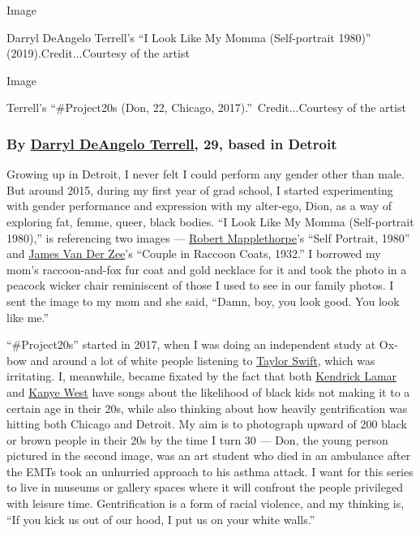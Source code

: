 Image

Darryl DeAngelo Terrell's ``I Look Like My Momma (Self-portrait 1980)''
(2019).Credit...Courtesy of the artist

Image

Terrell's ``\#Project20s (Don, 22, Chicago, 2017).''~Credit...Courtesy
of the artist

\hypertarget{by-darryl-deangelo-terrell-29-based-in-detroit}{%
\subsubsection{\texorpdfstring{\textbf{By}
\textbf{\href{http://darryldterrell.com/}{Darryl DeAngelo Terrell}, 29,
based in
Detroit}}{By Darryl DeAngelo Terrell, 29, based in Detroit}}\label{by-darryl-deangelo-terrell-29-based-in-detroit}}

Growing up in Detroit, I never felt I could perform any gender other
than male. But around 2015, during my first year of grad school, I
started experimenting with gender performance and expression with my
alter-ego, Dion, as a way of exploring fat, femme, queer, black bodies.
``I Look Like My Momma (Self-portrait 1980),'' is referencing two images
---
\href{https://www.nytimes3xbfgragh.onion/topic/person/robert-mapplethorpe}{Robert
Mapplethorpe}'s ``Self Portrait, 1980'' and
\href{https://www.nytimes3xbfgragh.onion/2019/02/28/nyregion/harlem-renaissance-james-van-der-zee.html}{James
Van Der Zee}'s ``Couple in Raccoon Coats, 1932.'' I borrowed my mom's
raccoon-and-fox fur coat and gold necklace for it and took the photo in
a peacock wicker chair reminiscent of those I used to see in our family
photos. I sent the image to my mom and she said, ``Damn, boy, you look
good. You look like me.''

``\#Project20s'' started in 2017, when I was doing an independent study
at Ox-bow and around a lot of white people listening to
\href{https://www.nytimes3xbfgragh.onion/topic/person/taylor-swift}{Taylor
Swift}, which was irritating. I, meanwhile, became fixated by the fact
that both
\href{https://www.nytimes3xbfgragh.onion/2017/03/01/t-magazine/beck-tom-waits-kendrick-lamar.html}{Kendrick
Lamar} and
\href{https://www.nytimes3xbfgragh.onion/2015/04/10/t-magazine/kanye-west-adidas-yeezy-fashion-interview.html}{Kanye
West} have songs about the likelihood of black kids not making it to a
certain age in their 20s, while also thinking about how heavily
gentrification was hitting both Chicago and Detroit. My aim is to
photograph upward of 200 black or brown people in their 20s by the time
I turn 30 --- Don, the young person pictured in the second image, was an
art student who died in an ambulance after the EMTs took an unhurried
approach to his asthma attack. I want for this series to live in museums
or gallery spaces where it will confront the people privileged with
leisure time. Gentrification is a form of racial violence, and my
thinking is, ``If you kick us out of our hood, I put us on your white
walls.''

